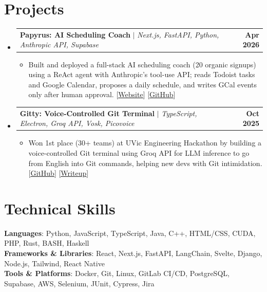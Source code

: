 \documentclass[letterpaper,11pt]{article}
\makeatletter
\newcommand{\resumeItem}[1]{
  \item\small{
    {#1 \vspace{-2pt}}
  }
}
\newcommand{\resumeProjectHeading}[2]{
    \item
    \begin{tabular*}{1.001\textwidth}{l@{\extracolsep{\fill}}r}
      \small#1 & \textbf{\small #2}\\
    \end{tabular*}\vspace{-7pt}
}
\newcommand{\resumeSubHeadingListStart}{\begin{itemize}[leftmargin=0.0in, label={}]}
\newcommand{\resumeSubHeadingListEnd}{\end{itemize}}
\newcommand{\resumeItemListStart}{\begin{itemize}}
\newcommand{\resumeItemListEnd}{\end{itemize}\vspace{-5pt}}
\makeatother
\begin{document}
\section{Projects}
    \vspace{-5pt}
    \resumeSubHeadingListStart
      \resumeProjectHeading
          {\textbf{Papyrus: AI Scheduling Coach} $|$ \emph{Next.js, FastAPI, Python, Anthropic API, Supabase}}{Apr 2026}
          \resumeItemListStart
            \resumeItem{Built and deployed a full-stack AI scheduling coach (20 organic signups) using a ReAct agent with Anthropic's tool-use API; reads Todoist tasks and Google Calendar, proposes a daily schedule, and writes GCal events only after human approval. \hfill [\href{https://papyrus-intelligence-tau.vercel.app}{\underline{Website}}] [\href{https://github.com/pauravhp/papyrus-intelligence}{\underline{GitHub}}]}
          \resumeItemListEnd
          \vspace{-13pt}
      \resumeProjectHeading
          {\textbf{Gitty: Voice-Controlled Git Terminal} $|$ \emph{TypeScript, Electron, Groq API, Vosk, Picovoice}}{Oct 2025}
          \resumeItemListStart
            \resumeItem{Won 1st place (30+ teams) at UVic Engineering Hackathon by building a voice-controlled Git terminal using Groq API for LLM inference to go from English into Git commands, helping new devs with Git intimidation. \hfill [\href{https://github.com/pauravhp/git-helper}{\underline{GitHub}}] [\href{https://www.linkedin.com/posts/paurav-h-param-025055264_gitty-hackathon-uvec-activity-7386635579616247809-E9Mf}{\underline{Writeup}}]}
          \resumeItemListEnd
    \resumeSubHeadingListEnd
\vspace{-15pt}


\section{Technical Skills}
 \begin{itemize}[leftmargin=0.15in, label={}]
    \small{\item{
     \textbf{Languages}{: Python, JavaScript, TypeScript, Java, C++, HTML/CSS, CUDA, PHP, Rust, BASH, Haskell} \\
     \textbf{Frameworks \& Libraries}{: React, Next.js, FastAPI, LangChain, Svelte, Django, Node.js, Tailwind, React Native} \\
     \textbf{Tools \& Platforms}{: Docker, Git, Linux, GitLab CI/CD, PostgreSQL, Supabase, AWS, Selenium, JUnit, Cypress, Jira} \\
    }}
 \end{itemize}
 \vspace{-16pt}
\end{document}
